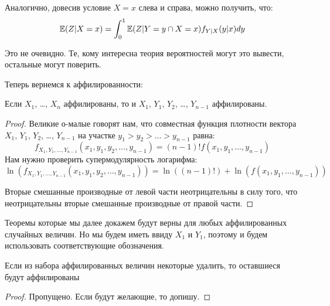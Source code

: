 Аналогично, довесив условие $ X=x $ слева и справа, можно получить, что:
\begin{equation}
\label{iterated_e}
\mathbb{E}(Z|X=x)=\int_{0}^{1}\mathbb{E}(Z|Y=y\cap X=x)f_{Y|X}(y|x)dy
\end{equation}

Это не очевидно. Те, кому интересна теория вероятностей могут это вывести, остальные могут поверить.



Теперь вернемся к аффилированности:

\begin{myth}
\label{aff_order}
Если $ X_{1} $, \ldots, $ X_{n} $ аффилированы, то и $ X_{1} $, $ Y_{1} $, $ Y_{2} $, \ldots, $ Y_{n-1} $ аффилированы.
\end{myth}

\begin{proof}
Великие о-малые говорят нам, что совместная функция плотности вектора $ X_{1} $, $ Y_{1} $, $ Y_{2} $, \ldots, $ Y_{n-1} $ на участке $ y_{1}>y_{2}>\ldots>y_{n-1} $ равна:
\begin{equation}
f_{X_{1},Y_{1},\ldots,Y_{n-1}}(x_{1},y_{1},y_{2},\ldots,y_{n-1})=(n-1)!f(x_{1},y_{1},\ldots,y_{n-1})
\end{equation}
Нам нужно проверить супермодулярность логарифма:
\begin{equation}
\ln(f_{X_{1},Y_{1},\ldots,Y_{n-1}}(x_{1},y_{1},y_{2},\ldots,y_{n-1}))=\ln((n-1)!)+\ln(f(x_{1},y_{1},\ldots,y_{n-1}))
\end{equation}

Вторые смешанные производные от левой части неотрицательны в силу того, что неотрицательны вторые смешанные производные от правой части.

\end{proof}



Теоремы которые мы далее докажем будут верны для любых аффилированных случайных величин. Но мы будем иметь ввиду $ X_{1} $ и $ Y_{1} $, поэтому и будем использовать соответствующие обозначения.

\begin{myth}
\label{aff_delete}
Если из набора аффилированных величин некоторые удалить, то оставшиеся будут аффилированы
\end{myth}

\begin{proof}
Пропущено. Если будут желающие, то допишу.

\end{proof}


